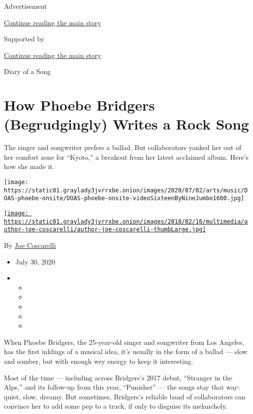 Advertisement

\protect\hyperlink{after-top}{Continue reading the main story}

Supported by

\protect\hyperlink{after-sponsor}{Continue reading the main story}

Diary of a Song

\hypertarget{how-phoebe-bridgers-begrudgingly-writes-a-rock-song}{%
\section{How Phoebe Bridgers (Begrudgingly) Writes a Rock
Song}\label{how-phoebe-bridgers-begrudgingly-writes-a-rock-song}}

The singer and songwriter prefers a ballad. But collaborators yanked her
out of her comfort zone for ``Kyoto,'' a breakout from her latest
acclaimed album. Here's how she made it.

\texttt{[image: https://static01.graylady3jvrrxbe.onion/images/2020/07/02/arts/music/DOAS-phoebe-onsite/DOAS-phoebe-onsite-videoSixteenByNineJumbo1600.jpg]}

\href{https://www.nytimes3xbfgragh.onion/by/joe-coscarelli}{\texttt{[image: https://static01.graylady3jvrrxbe.onion/images/2018/02/16/multimedia/author-joe-coscarelli/author-joe-coscarelli-thumbLarge.jpg]}}

By \href{https://www.nytimes3xbfgragh.onion/by/joe-coscarelli}{Joe
Coscarelli}

\begin{itemize}
\item
  July 30, 2020
\item
  \begin{itemize}
  \item
  \item
  \item
  \item
  \item
  \end{itemize}
\end{itemize}

When Phoebe Bridgers, the 25-year-old singer and songwriter from Los
Angeles, has the first inklings of a musical idea, it's usually in the
form of a ballad --- slow and somber, but with enough wry energy to keep
it interesting.

Most of the time --- including across Bridgers's 2017 debut, ``Stranger
in the Alps,'' and its follow-up from this year, ``Punisher'' --- the
songs stay that way: quiet, slow, dreamy. But sometimes, Bridgers's
reliable band of collaborators can convince her to add some pep to a
track, if only to disguise its melancholy.

